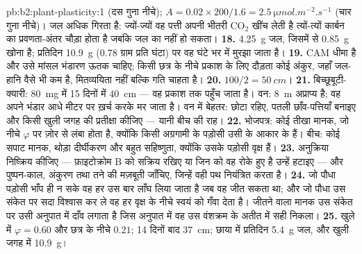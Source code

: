 \begin{solution}{pb:b2:plant-plasticity:1}
(दस गुना नीचे); $A = 0.02\times 200/1.6 = \qty{2.5}{\micro
mol.m^{-2}.s^{-1}}$ (चार गुना नीचे)। जल अधिक गिरता है: ज्यों-ज्यों वह
पत्ती अपनी भीतरी $\mathrm{CO_2}$ खींच लेती है त्यों-त्यों कार्बन का
प्रवणता-अंतर चौड़ा होता है जबकि जल का नहीं हो सकता।
\textbf{18.} \qty{4.25}{g} जल, जिसमें से \qty{0.85}{g} खोना है;
प्रतिदिन \qty{10.9}{g} ($0.78$ ग्राम प्रति घंटा) पर वह घंटे भर में मुरझा जाता है।
\textbf{19.} CAM धीमा है और उसे मांसल भंडारण ऊतक चाहिए; किसी छत्र के
नीचे प्रकाश के लिए दौड़ता कोई अंकुर, जहाँ जल-हानि वैसे भी कम है,
मितव्ययिता नहीं बल्कि गति चाहता है।
\textbf{20.} $100/2 = \qty{50}{cm}$।
\textbf{21.} बिच्छूबूटी-क्यारी: \qty{80}{mg} में 15 दिनों में \qty{40}{cm} ---
वह प्रकाश तक पहुँच जाता है। वन: \qty{8}{m} अप्राप्य है; वह अपने
भंडार आधे मीटर पर ख़र्च करके मर जाता है। वन में बेहतर: छोटा रहिए,
पतली छाँव-पत्तियाँ बनाइए और किसी खुली जगह की प्रतीक्षा कीजिए --- यानी बीच की राह।
\textbf{22.} भोजपत्र: कोई तीखा मानक, जो नीचे $\varphi$ पर ज़ोर से लंबा
होता है, क्योंकि किसी अग्रगामी के पड़ोसी उसी के आकार के हैं। बीच: कोई
सपाट मानक, थोड़ा दीर्घीकरण और बहुत सहिष्णुता, क्योंकि उसके पड़ोसी
वृक्ष हैं।
\textbf{23.}  अनुक्रिया निष्क्रिय कीजिए --- फ़ाइटोक्रोम B
को सक्रिय रखिए या जिन  को वह रोके हुए है उन्हें हटाइए ---
और पुष्पन-काल, अंकुरण तथा तने की मज़बूती जाँचिए, जिन्हें वही
पथ नियंत्रित करता है।
\textbf{24.} जो पौधा पड़ोसी भाँप ही न सके वह हर उस बार लाँघ लिया जाता है
जब वह जीत सकता था; और जो पौधा उस संकेत पर सदा विश्वास कर ले वह हर वृक्ष
के नीचे स्वयं को गँवा देता है। जीतने वाला मानक उस संकेत पर उसी अनुपात
में दाँव लगाता है जिस अनुपात में वह उस वंशक्रम के अतीत में सही
निकला।
\textbf{25.} खुले में $\varphi = 0.60$ और छत्र के नीचे $0.21$;
14 दिनों बाद \qty{37}{cm}; छाया में प्रतिदिन \qty{5.4}{g} जल,
और खुली जगह में \qty{10.9}{g}।
\end{solution}
